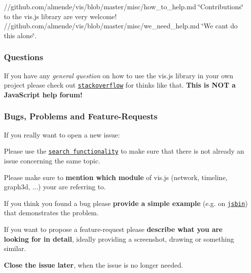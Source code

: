 //github.com/almende/vis/blob/master/misc/how\+\_\+to\+\_\+help.\+md \char`\"{}\+Contributions\char`\"{} to the vis.\+js library are very welcome! //github.com/almende/vis/blob/master/misc/we\+\_\+need\+\_\+help.\+md \char`\"{}\+We can\textquotesingle{}t do this alone\char`\"{}.

\subsubsection*{Questions}

If you have any {\itshape general question} on how to use the vis.\+js library in your own project please check out \href{http://stackoverflow.com/questions/tagged/vis.js}{\tt stackoverflow} for thinks like that. {\bfseries This is N\+OT a Java\+Script help forum!}

\subsubsection*{Bugs, Problems and Feature-\/\+Requests}

If you really want to open a new issue\+:
\begin{DoxyItemize}
\item Please use the \href{//github.com/almende/vis/issues}{\tt search functionality} to make sure that there is not already an issue concerning the same topic.
\item Please make sure to {\bfseries mention which module} of vis.\+js (network, timeline, graph3d, ...) your are referring to.
\item If you think you found a bug please {\bfseries provide a simple example} (e.\+g. on \href{jsbin.com}{\tt jsbin}) that demonstrates the problem.
\item If you want to propose a feature-\/request please {\bfseries describe what you are looking for in detail}, ideally providing a screenshot, drawing or something similar.
\item {\bfseries Close the issue later}, when the issue is no longer needed. 
\end{DoxyItemize}